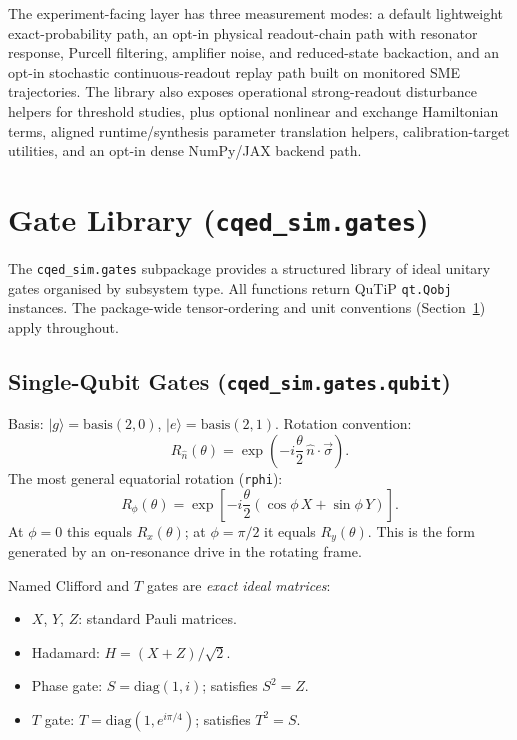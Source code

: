 \documentclass[11pt]{article}
\begin{document}
\noindent
The experiment-facing layer has three measurement modes: a default lightweight
exact-probability path, an opt-in physical readout-chain path with resonator
response, Purcell filtering, amplifier noise, and reduced-state backaction, and an
opt-in stochastic continuous-readout replay path built on monitored SME
trajectories. The library also exposes operational strong-readout disturbance
helpers for threshold studies, plus optional nonlinear and exchange Hamiltonian
terms, aligned runtime/synthesis parameter translation helpers, calibration-target
utilities, and an opt-in dense NumPy/JAX backend path.

\section{Gate Library (\texttt{cqed\_sim.gates})}
\label{sec:gate_library}

\noindent
The \texttt{cqed\_sim.gates} subpackage provides a structured library of ideal
unitary gates organised by subsystem type. All functions return QuTiP
\texttt{qt.Qobj} instances. The package-wide tensor-ordering and unit
conventions (Section~\ref{sec:gate_library}) apply throughout.

\subsection{Single-Qubit Gates (\texttt{cqed\_sim.gates.qubit})}
\label{subsec:single_qubit_gates}

\noindent
Basis: \(|g\rangle = \text{basis}(2,0)\), \(|e\rangle = \text{basis}(2,1)\).
Rotation convention:
\[
  R_{\hat{n}}(\theta) = \exp\!\left(-i\frac{\theta}{2}\,\hat{n}\cdot\vec{\sigma}\right).
\]
The most general equatorial rotation (\texttt{rphi}):
\[
  R_{\phi}(\theta) = \exp\!\left[-i\frac{\theta}{2}\left(\cos\phi\,X + \sin\phi\,Y\right)\right].
\]
At \(\phi=0\) this equals \(R_x(\theta)\); at \(\phi=\pi/2\) it equals \(R_y(\theta)\).
This is the form generated by an on-resonance drive in the rotating frame.

Named Clifford and \(T\) gates are \emph{exact ideal matrices}:
\begin{itemize}[leftmargin=1.5em]
  \item \(X\), \(Y\), \(Z\): standard Pauli matrices.
  \item Hadamard: \(H = (X+Z)/\sqrt{2}\).
  \item Phase gate: \(S = \mathrm{diag}(1,i)\); satisfies \(S^2 = Z\).
  \item \(T\) gate: \(T = \mathrm{diag}(1, e^{i\pi/4})\); satisfies \(T^2 = S\).
\end{itemize}
\end{document}
